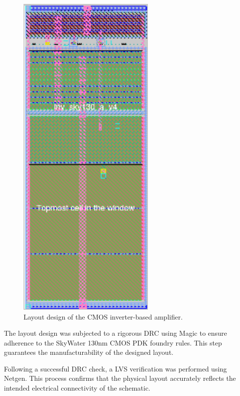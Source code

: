 \begin{figure}[ht!]
\centering
\includegraphics[width=0.6\textwidth]{Figures/final_layout.png}
\caption{Layout design of the CMOS inverter-based amplifier.}
\label{fig:layout_v4}
\end{figure}

The layout design was subjected to a rigorous DRC using Magic to ensure adherence to the SkyWater 130nm CMOS PDK foundry rules. 
This step guarantees the manufacturability of the designed layout.

Following a successful DRC check, a LVS verification was performed using Netgen. 
This process confirms that the physical layout accurately reflects the intended electrical connectivity of the schematic.

